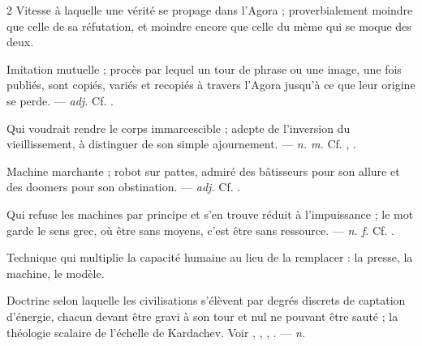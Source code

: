 \begin{multicols}{2}
 Vitesse à laquelle une vérité se propage dans l'Agora ; proverbialement moindre que celle de sa réfutation, et moindre encore que celle du mème qui se moque des deux.  

 Imitation mutuelle ; procès par lequel un tour de phrase ou une image, une fois publiés, sont copiés, variés et recopiés à travers l'Agora jusqu'à ce que leur origine se perde.   —  \textit{adj.} Cf. .

 Qui voudrait rendre le corps immarcescible ; adepte de l'inversion du vieillissement, à distinguer de son simple ajournement. —  \textit{n. m.} Cf. , .

 Machine marchante ; robot sur pattes, admiré des bâtisseurs pour son allure et des doomers pour son obstination.   —  \textit{adj.} Cf. .

 Qui refuse les machines par principe et s'en trouve réduit à l'impuissance ; le mot garde le sens grec, où être sans moyens, c'est être sans ressource. —  \textit{n. f.} Cf. .

 Technique qui multiplie la capacité humaine au lieu de la remplacer : la presse, la machine, le modèle. 

 Doctrine selon laquelle les civilisations s'élèvent par degrés discrets de captation d'énergie, chacun devant être gravi à son tour et nul ne pouvant être sauté ; la théologie scalaire de l'échelle de Kardachev. Voir , , , . —  \textit{n.}


\end{multicols}
